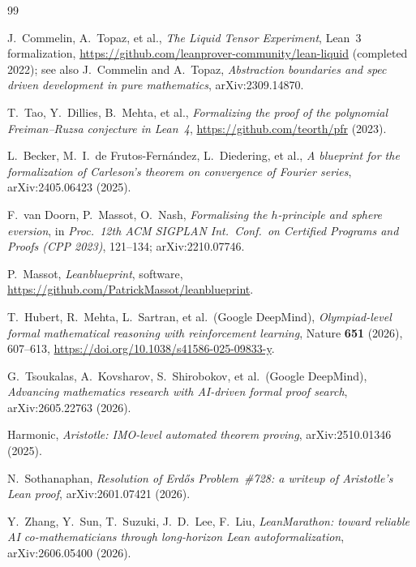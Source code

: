 \documentclass[11pt]{article}
\theoremstyle{plain}
\theoremstyle{definition}
\theoremstyle{remark}
\begin{document}
\begin{thebibliography}{99}

 J.~Commelin, A.~Topaz, et al.,
  \emph{The Liquid Tensor Experiment}, Lean~3 formalization,
  \url{https://github.com/leanprover-community/lean-liquid} (completed 2022);
  see also J.~Commelin and A.~Topaz,
  \emph{Abstraction boundaries and spec driven development in pure mathematics},
  arXiv:2309.14870.

 T.~Tao, Y.~Dillies, B.~Mehta, et al.,
  \emph{Formalizing the proof of the polynomial Freiman--Ruzsa conjecture in
  Lean~4}, \url{https://github.com/teorth/pfr} (2023).

 L.~Becker, M.~I.~de Frutos-Fern\'andez, L.~Diedering, et al.,
  \emph{A blueprint for the formalization of Carleson's theorem on convergence
  of Fourier series}, arXiv:2405.06423 (2025).

 F.~van Doorn, P.~Massot, O.~Nash,
  \emph{Formalising the $h$-principle and sphere eversion}, in
  \emph{Proc.\ 12th ACM SIGPLAN Int.\ Conf.\ on Certified Programs and Proofs
  (CPP 2023)}, 121--134; arXiv:2210.07746.

 P.~Massot, \emph{Leanblueprint}, software,
  \url{https://github.com/PatrickMassot/leanblueprint}.

 T.~Hubert, R.~Mehta, L.~Sartran, et al.\ (Google DeepMind),
  \emph{Olympiad-level formal mathematical reasoning with reinforcement
  learning}, Nature \textbf{651} (2026), 607--613,
  \url{https://doi.org/10.1038/s41586-025-09833-y}.

 G.~Tsoukalas, A.~Kovsharov, S.~Shirobokov, et al.\
  (Google DeepMind), \emph{Advancing mathematics research with AI-driven formal
  proof search}, arXiv:2605.22763 (2026).

 Harmonic,
  \emph{Aristotle: IMO-level automated theorem proving}, arXiv:2510.01346 (2025).

 N.~Sothanaphan,
  \emph{Resolution of Erd\H{o}s Problem~\#728: a writeup of Aristotle's Lean
  proof}, arXiv:2601.07421 (2026).

 Y.~Zhang, Y.~Sun, T.~Suzuki, J.~D.~Lee, F.~Liu,
  \emph{LeanMarathon: toward reliable AI co-mathematicians through long-horizon
  Lean autoformalization}, arXiv:2606.05400 (2026).


\end{thebibliography}
\end{document}
